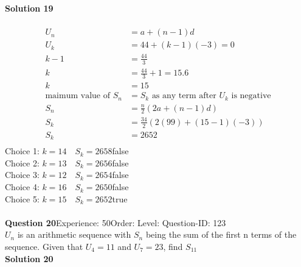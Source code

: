 \documentclass{article}
\begin{document}
\noindent\textbf{Solution 19}\\[2pt]
\\[-35pt]\begin{align*}
U_n&=a+(n-1)d\\[2pt]
U_k&=44+(k-1)(-3)=0\\[2pt]
k-1&=\displaystyle\frac{44}{3}\\[2pt]
k&=\displaystyle\frac{44}{3}+1=15.6\\[2pt]
k&=15\\[12pt]
\text{maimum value of} \,\,S_n&=S_k\,\, \text{as any term after}\,\, U_k\,\, \text{is negative}\\[2pt]
S_n&=\displaystyle\frac{n}{2}(2a+(n-1)d)\\[2pt]
S_k&=\displaystyle\frac{34}{2}(2(99)+(15-1)(-3))\\[2pt]
S_k&=2652\\[-90pt]
\end{align*}
Choice 1: \hspace{20pt}$k=14 \quad S_k=2658$\hspace{20pt}false\\
Choice 2: \hspace{20pt}$k=13 \quad S_k=2656$\hspace{20pt}false\\
Choice 3: \hspace{20pt}$k=12 \quad S_k=2654$\hspace{20pt}false\\
Choice 4: \hspace{20pt}$k=16 \quad S_k=2650$\hspace{20pt}false\\
Choice 5: \hspace{20pt}$k=15 \quad S_k=2652$\hspace{20pt}true\\
\\[4pt]
\noindent\textbf{Question 20}\hspace{20pt}Experience: 50\hspace{20pt}Order: \hspace{20pt}Level: \hspace{20pt}Question-ID: 123\\[2pt]
$U_n$ is an arithmetic sequence with $S_n$ being the sum of the first n terms of the sequence. Given that $U_4=11$ and $U_7=23$, find $S_{11}$\\[4pt]
\noindent\textbf{Solution 20}\\[2pt]
\end{document}
